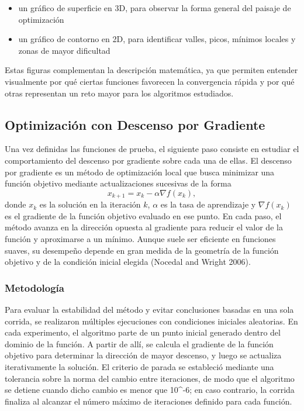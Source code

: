 \documentclass[
  12pt,
  letterpaper,
  DIV=11,
  numbers=noendperiod]{scrartcl}
\providecommand{\tightlist}{%
  \setlength{\itemsep}{0pt}\setlength{\parskip}{0pt}}
\begin{document}
\begin{itemize}
\tightlist
\item
  un gráfico de superficie en 3D, para observar la forma general del
  paisaje de optimización
\item
  un gráfico de contorno en 2D, para identificar valles, picos, mínimos
  locales y zonas de mayor dificultad
\end{itemize}

Estas figuras complementan la descripción matemática, ya que permiten
entender visualmente por qué ciertas funciones favorecen la convergencia
rápida y por qué otras representan un reto mayor para los algoritmos
estudiados.

\subsection{Optimización con Descenso por
Gradiente}\label{optimizaciuxf3n-con-descenso-por-gradiente}

Una vez definidas las funciones de prueba, el siguiente paso consiste en
estudiar el comportamiento del descenso por gradiente sobre cada una de
ellas. El descenso por gradiente es un método de optimización local que
busca minimizar una función objetivo mediante actualizaciones sucesivas
de la forma \[
x_{k+1} = x_k - \alpha \nabla f(x_k),
\] donde \(x_k\) es la solución en la iteración \(k\), \(\alpha\) es la
tasa de aprendizaje y \(\nabla f(x_k)\) es el gradiente de la función
objetivo evaluado en ese punto. En cada paso, el método avanza en la
dirección opuesta al gradiente para reducir el valor de la función y
aproximarse a un mínimo. Aunque suele ser eficiente en funciones suaves,
su desempeño depende en gran medida de la geometría de la función
objetivo y de la condición inicial elegida (Nocedal and Wright 2006).

\subsubsection{Metodología}\label{metodologuxeda}

Para evaluar la estabilidad del método y evitar conclusiones basadas en
una sola corrida, se realizaron múltiples ejecuciones con condiciones
iniciales aleatorias. En cada experimento, el algoritmo parte de un
punto inicial generado dentro del dominio de la función. A partir de
allí, se calcula el gradiente de la función objetivo para determinar la
dirección de mayor descenso, y luego se actualiza iterativamente la
solución. El criterio de parada se estableció mediante una tolerancia
sobre la norma del cambio entre iteraciones, de modo que el algoritmo se
detiene cuando dicho cambio es menor que 10\^{}-6; en caso contrario, la
corrida finaliza al alcanzar el número máximo de iteraciones definido
para cada función.
\end{document}
